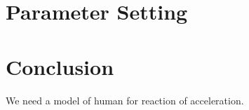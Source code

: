 
\section{Parameter Setting}



\section{Conclusion}
We need a model of human for reaction of acceleration.